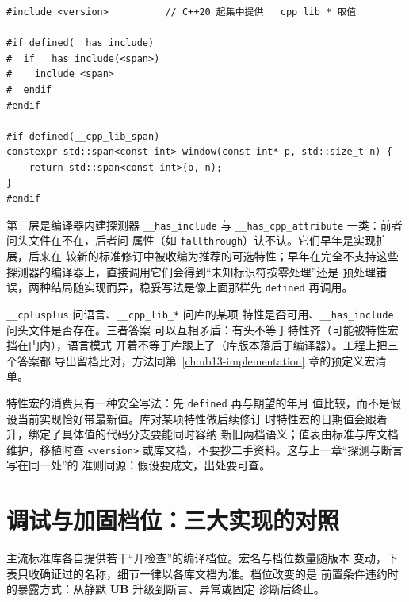 \documentclass[12pt,a4paper,fontset=fandol]{ctexbook}
\newcommand{\Tp}[1]{\texttt{#1}}
\newcommand{\UB}{\textbf{\textsf{UB}}}
\newcommand{\Hdr}[1]{\texttt{<#1>}}
\newcommand{\Feat}[1]{\texttt{#1}}
\begin{document}
\begin{lstlisting}[style=cppstyle, caption={三层探测的分工示例：语言宏、库特性宏、头文件存在性}]
#include <version>          // C++20 起集中提供 __cpp_lib_* 取值

#if defined(__has_include)
#  if __has_include(<span>)
#    include <span>
#  endif
#endif

#if defined(__cpp_lib_span)
constexpr std::span<const int> window(const int* p, std::size_t n) {
    return std::span<const int>(p, n);
}
#endif
\end{lstlisting}

第三层是编译器内建探测器 \Feat{\_\_has\_include} 与
\Feat{\_\_has\_cpp\_attribute} 一类：前者问头文件在不在，后者问
属性（如 \Tp{fallthrough}）认不认。它们早年是实现扩展，后来在
较新的标准修订中被收编为推荐的可选特性；早年在完全不支持这些
探测器的编译器上，直接调用它们会得到“未知标识符按零处理”还是
预处理错误，两种结局随实现而异，稳妥写法是像上面那样先
\Feat{defined} 再调用。

\begin{note}[title=三类探测器的分工边界]
\Feat{\_\_cplusplus} 问语言、\Feat{\_\_cpp\_lib\_*} 问库的某项
特性是否可用、\Feat{\_\_has\_include} 问头文件是否存在。三者答案
可以互相矛盾：有头不等于特性齐（可能被特性宏挡在门内），语言模式
开着不等于库跟上了（库版本落后于编译器）。工程上把三个答案都
导出留档比对，方法同第~\ref{ch:ub13-implementation} 章的预定义宏清单。
\end{note}

特性宏的消费只有一种安全写法：先 \Feat{defined} 再与期望的年月
值比较，而不是假设当前实现恰好带最新值。库对某项特性做后续修订
时特性宏的日期值会跟着升，绑定了具体值的代码分支要能同时容纳
新旧两档语义；值表由标准与库文档维护，移植时查 \Hdr{version}
或库文档，不要抄二手资料。这与上一章“探测与断言写在同一处”的
准则同源：假设要成文，出处要可查。

\section{调试与加固档位：三大实现的对照}\label{sec:ub14-debug-tiers}

主流标准库各自提供若干“开检查”的编译档位。宏名与档位数量随版本
变动，下表只收确证过的名称，细节一律以各库文档为准。档位改变的是
前置条件违约时的暴露方式：从静默 \UB{} 升级到断言、异常或固定
诊断后终止。
\end{document}
